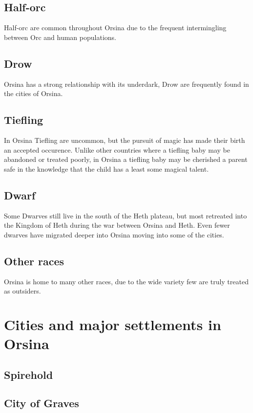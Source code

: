 \documentclass[10pt,twoside,twocolumn,openany,justified,bg=full,nomultitoc]{dndbook}
\begin{document}
\subsection{Half-orc}
\label{sec-3-3-3}
Half-orc are common throughout Orsina due to the frequent intermingling between Orc and human populations. 

\subsection{Drow}
\label{sec-3-3-4}
Orsina has a strong relationship with its underdark, Drow are frequently found in the cities of Orsina.

\subsection{Tiefling}
\label{sec-3-3-5}
In Orsina Tiefling are uncommon, but the pursuit of magic has made their birth an accepted occurence. Unlike other countries where a tiefling baby may be abandoned or treated poorly, in Orsina a tiefling baby may be cherished a parent safe in the knowledge that the child has a least some magical talent.

\subsection{Dwarf}
\label{sec-3-3-6}
Some Dwarves still live in the south of the Heth plateau, but most retreated into the Kingdom of Heth during the war between Orsina and Heth. Even fewer dwarves have migrated deeper into Orsina moving into some of the cities. 

\subsection{Other races}
\label{sec-3-3-7}
Orsina is home to many other races, due to the wide variety few are truly treated as outsiders.

\section{Cities and major settlements in Orsina}
\label{sec-3-4}
\subsection{Spirehold}
\label{sec-3-4-1}
\subsection{City of Graves}
\label{sec-3-4-2}
\end{document}
